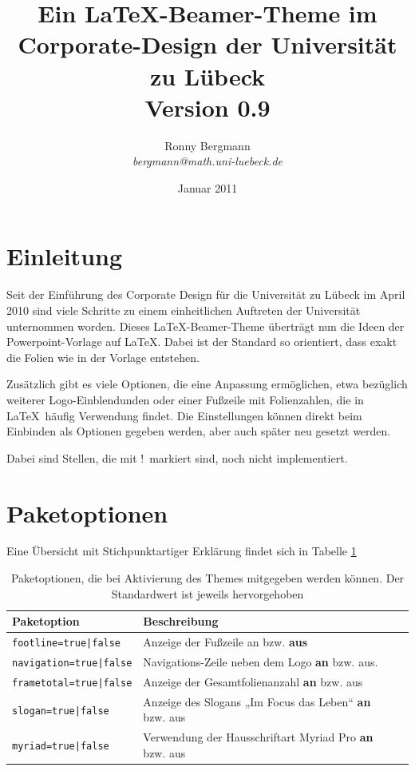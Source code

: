 \documentclass[a4paper,DIV=calc, oneside]{scrartcl}
\newcommand{\missing}{{\color{red}!}}
\begin{document}
	\thispagestyle{empty}
\title{\vspace{-3\baselineskip}Ein \textnormal{\LaTeX}-Beamer-Theme im Corporate-Design der Universität zu Lübeck\\{\large\normalfont Version 0.9}}
\author{Ronny Bergmann\\\emph{bergmann@math.uni-luebeck.de}}
\date{Januar 2011}
\maketitle
\section{Einleitung}
Seit der Einführung des Corporate Design für die Universität zu Lübeck im April 2010 sind viele Schritte zu einem einheitlichen Auftreten der Universität unternommen worden. Dieses \LaTeX-Beamer-Theme überträgt nun die Ideen der
Powerpoint-Vorlage auf \LaTeX. Dabei ist der Standard so orientiert, dass exakt die Folien wie in der Vorlage entstehen.

Zusätzlich gibt es viele Optionen, die eine Anpassung ermöglichen, etwa bezüglich weiterer Logo-Einblendunden oder
einer Fußzeile mit Folienzahlen, die in \LaTeX\ häufig Verwendung findet. Die Einstellungen können direkt beim Einbinden als Optionen gegeben werden, aber auch später neu gesetzt werden.

Dabei sind Stellen, die mit \missing\  markiert sind, noch nicht implementiert.

\section{Paketoptionen}
Eine Übersicht mit Stichpunktartiger Erklärung findet sich in Tabelle \ref{tab:Paketoptionen}
\begin{table}[hbt]
	\begin{tabular}{llll}
		\toprule
		\textbf{Paketoption} & \textbf{Beschreibung}\\\midrule
		\lstinline!footline=true|false! & Anzeige der Fußzeile an bzw. \textbf{aus}\\
		\lstinline!navigation=true|false! & Navigations-Zeile neben dem Logo \textbf{an} bzw. aus.\\
		\lstinline!frametotal=true|false! & Anzeige der Gesamtfolienanzahl \textbf{an} bzw. aus\\
		\lstinline!slogan=true|false! & Anzeige des Slogans „Im Focus das Leben“ \textbf{an} bzw. aus\\
		\lstinline!myriad=true|false! & Verwendung der Hausschriftart Myriad Pro \textbf{an} bzw. aus\\\bottomrule
	\end{tabular}
	\caption{Paketoptionen, die bei Aktivierung des Themes mitgegeben werden können. Der Standardwert ist jeweils hervorgehoben}
	\label{tab:Paketoptionen}
\end{table}
\end{document}
